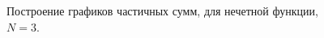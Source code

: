 \documentclass[a5paper, 10pt]{article}
\theoremstyle{definition}
\theoremstyle{plain}
\theoremstyle{remark}
\begin{document}
\begin{figure}[h]
\begin{minipage}[h]{0.5\linewidth}
\end{minipage}
\hfill
\begin{minipage}[h]{0.5\linewidth}
\end{minipage}
\caption{Построение графиков частичных сумм, для нечетной функции, $N=3$.}
\vfill


\end{figure}
\end{document}
